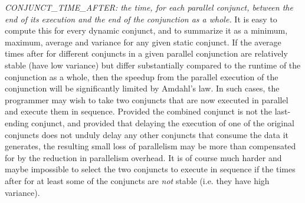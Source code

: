 


\emph{CONJUNCT\_TIME\_AFTER:
the time, for each parallel conjunct,
between the end of its execution and the end of the conjunction as a whole.}
It is easy to compute this for every dynamic conjunct,
and to summarize it as a minimum, maximum, average and variance
for any given static conjunct.
If the average times after
for different conjuncts in a given parallel conjunction
are relatively stable (have low variance)
but differ substantially compared to the runtime of the conjunction as a whole,
then the speedup from the parallel execution of the conjunction
will be significantly limited by Amdahl's law.
In such cases, the programmer may wish to take
two conjuncts that are now executed in parallel
and execute them in sequence.
Provided the combined conjunct is not the last-ending conjunct,
and provided that delaying the execution of one of the original conjuncts
does not unduly delay any other conjuncts that consume the data it generates,
the resulting small loss of parallelism
may be more than compensated for
by the reduction in parallelism overhead.
It is of course much harder and maybe impossible
to select the two conjuncts to execute in sequence
if the times after for at least some of the conjuncts
are \emph{not} stable (i.e. they have high variance).

